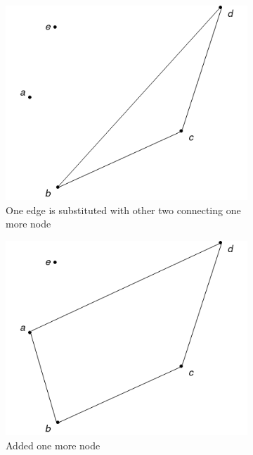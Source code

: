 \begin{figure}
\begin{subfigure}[b]{0.3\textwidth}
		\includegraphics[width=\textwidth]{images/extra_3}
		\caption{One edge is substituted with other two connecting one more node}
	\end{subfigure}
	\bigskip
	\begin{subfigure}{0.3\textwidth}
		\centering
		\includegraphics[width=\textwidth]{images/extra_4}
		\caption{Added one more node}
	\end{subfigure}
	\hfill
	\begin{subfigure}{0.3\textwidth}
		\centering

\end{subfigure}
\end{figure}
